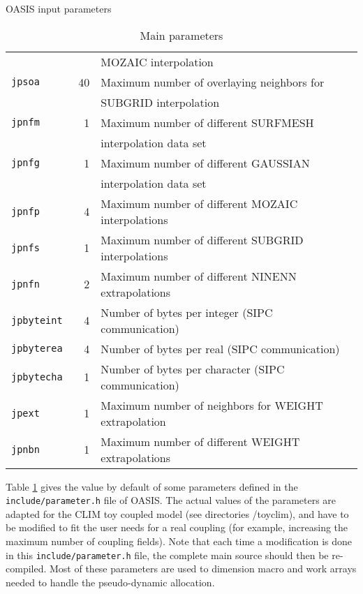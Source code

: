 \begin{subsection}{OASIS input parameters}
\begin{table}[hbtp]
\begin{center}
\begin{tabular}{|lrl|}
 &  &   MOZAIC interpolation \\
  {\tt jpsoa  }     & 40 &  Maximum number of overlaying neighbors for \\
 &  &    SUBGRID interpolation  \\
  {\tt  jpnfm }     & 1 & Maximum number of different SURFMESH \\
 &  &  interpolation data set \\
  {\tt  jpnfg }     & 1 & Maximum number of different GAUSSIAN \\
 &  &  interpolation data set \\
  {\tt  jpnfp }     & 4 & Maximum number of different MOZAIC
  interpolations \\
  {\tt  jpnfs }     & 1 & Maximum number of different SUBGRID
  interpolations \\
  {\tt  jpnfn }     & 2 & Maximum number of different NINENN extrapolations
   \\
  {\tt  jpbyteint } & 4 & Number of bytes per integer (SIPC communication)
  \\
  {\tt  jpbyterea } & 4 & Number of bytes per real (SIPC communication)\\
  {\tt  jpbytecha } & 1 & Number of bytes per character (SIPC communication)\\
  {\tt  jpext } & 1 &  Maximum number of neighbors for WEIGHT extrapolation \\
  {\tt  jpnbn } & 1 &  Maximum number of different WEIGHT extrapolations \\
\hline
\end{tabular}
\end{center}
\caption{Main parameters}
\label{tab.dims}
\end{table}

Table \ref{tab.dims} gives the value by default of some parameters
defined in the {\tt include/parameter.h} file of OASIS. The actual
values of the parameters  
are adapted for the CLIM toy coupled model (see directories /toyclim),
and have to be modified to fit the user needs for a real
coupling (for example, 
increasing the maximum number of coupling fields). Note that each time a
modification is done in this {\tt include/parameter.h} file, the 
complete main source should then be re-compiled.
Most of these parameters are used to dimension macro and work arrays
needed to handle the pseudo-dynamic allocation.

%
\end{subsection}